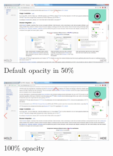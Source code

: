 \documentclass[journal]{./IEEE/IEEEtran}
\begin{document}
\begin{figure}[h!]
  \centering
    \includegraphics[width=0.5\textwidth]{./images/50_opacity.png}
  \caption{ Default opacity in 50\% }
  \label{fig:5}
\end{figure}

\begin{figure}[h!]
  \centering
    \includegraphics[width=0.5\textwidth]{./images/100_opacity.png}
  \caption{100\% opacity}
  \label{fig:6}
\end{figure}
\end{document}
